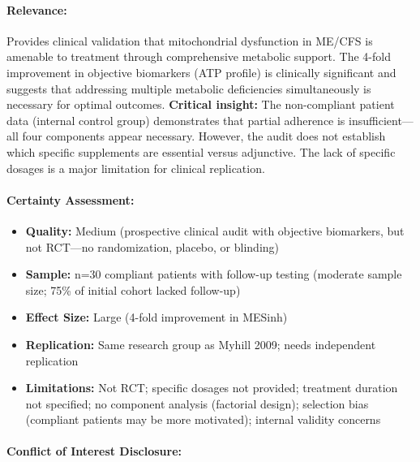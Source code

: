 \paragraph{Relevance:}
Provides clinical validation that mitochondrial dysfunction in ME/CFS is amenable to treatment through comprehensive metabolic support. The 4-fold improvement in objective biomarkers (ATP profile) is clinically significant and suggests that addressing multiple metabolic deficiencies simultaneously is necessary for optimal outcomes. \textbf{Critical insight:} The non-compliant patient data (internal control group) demonstrates that partial adherence is insufficient---all four components appear necessary. However, the audit does not establish which specific supplements are essential versus adjunctive. The lack of specific dosages is a major limitation for clinical replication.

\paragraph{Certainty Assessment:}
\begin{itemize}
    \item \textbf{Quality:} Medium (prospective clinical audit with objective biomarkers, but not RCT---no randomization, placebo, or blinding)
    \item \textbf{Sample:} n=30 compliant patients with follow-up testing (moderate sample size; 75\% of initial cohort lacked follow-up)
    \item \textbf{Effect Size:} Large (4-fold improvement in MESinh)
    \item \textbf{Replication:} Same research group as Myhill 2009; needs independent replication
    \item \textbf{Limitations:} Not RCT; specific dosages not provided; treatment duration not specified; no component analysis (factorial design); selection bias (compliant patients may be more motivated); internal validity concerns
\end{itemize}

\paragraph{Conflict of Interest Disclosure:}

